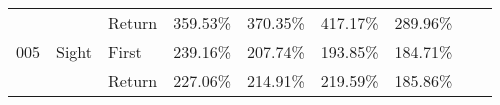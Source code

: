 \begin{table}[!htb]
\begin{tabular}{lllrrrrrr}
    &       & Return &  359.53\% &                                              370.35\% &                                               417.17\% &   289.96\% \\
005 & Sight & First &  239.16\% &                                              207.74\% &                                               193.85\% &   184.71\% \\
    &       & Return &  227.06\% &                                              214.91\% &                                               219.59\% &   185.86\% \\
\bottomrule
\end{tabular}
\end{table}

